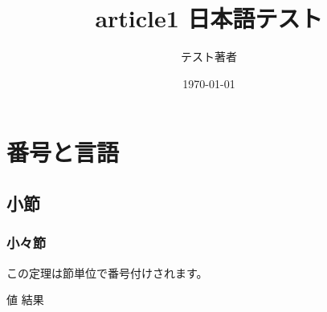 \documentclass[11pt,a4paper]{ltjsarticle}
\title{article1 日本語テスト}
\author{テスト著者}
\date{\today}
\begin{document}
\maketitle
\tableofcontents

\section{番号と言語}

\subsection{小節}

\subsubsection{小々節}

\begin{theorem}[見出し]
この定理は節単位で番号付けされます。
\end{theorem}

\begin{algorithm}
  \caption{入出力見出しの確認}
  \begin{algorithmic}
    \AlgInput 値
    \AlgOutput 結果
  \end{algorithmic}
\end{algorithm}
\end{document}

